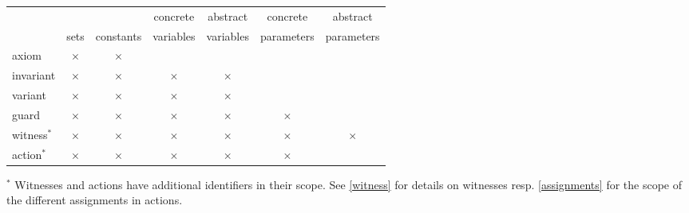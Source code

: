 \begin{center}
  \newcommand{\markcell}{$\times$}
  \begin{tabular}{lcccccc}
  \hline
            &           &           & concrete  & abstract  & concrete   & abstract \\
            & sets      & constants & variables & variables & parameters & parameters \\
  \hline
  axiom     & \markcell & \markcell &           &           &            & \\
  invariant & \markcell & \markcell & \markcell & \markcell &            & \\
  variant   & \markcell & \markcell & \markcell & \markcell &            & \\
  guard     & \markcell & \markcell & \markcell & \markcell & \markcell  & \\
  witness$^{*}$   & \markcell & \markcell & \markcell & \markcell & \markcell  & \markcell \\
  action$^{*}$    & \markcell & \markcell & \markcell & \markcell & \markcell  &  \\
  \hline
  \end{tabular}    
\end{center}

$\mbox{}^{*}$ Witnesses and actions have additional identifiers in their scope.
See \ref{witness} for details on witnesses resp. \ref{assignments} for the scope
of the different assignments in actions.

